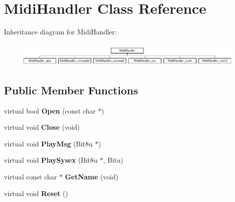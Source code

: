 \hypertarget{classMidiHandler}{\section{Midi\-Handler Class Reference}
\label{classMidiHandler}
}
Inheritance diagram for Midi\-Handler\-:\begin{figure}[H]
\begin{center}
\leavevmode
\includegraphics[height=1.220044cm]{classMidiHandler}
\end{center}
\end{figure}
\subsection*{Public Member Functions}
\begin{DoxyCompactItemize}
\item 
\hypertarget{classMidiHandler_aaac23e165375be912b77ab5d354ff8c1}{virtual bool {\bfseries Open} (const char $\ast$)}\label{classMidiHandler_aaac23e165375be912b77ab5d354ff8c1}

\item 
\hypertarget{classMidiHandler_a452affdc7cbccf4fbe60a574fb615575}{virtual void {\bfseries Close} (void)}\label{classMidiHandler_a452affdc7cbccf4fbe60a574fb615575}

\item 
\hypertarget{classMidiHandler_acd62ebefbe21ef89185897f571e39504}{virtual void {\bfseries Play\-Msg} (Bit8u $\ast$)}\label{classMidiHandler_acd62ebefbe21ef89185897f571e39504}

\item 
\hypertarget{classMidiHandler_aed229d871437ff05ff4e0b4ef12ff4a1}{virtual void {\bfseries Play\-Sysex} (Bit8u $\ast$, Bitu)}\label{classMidiHandler_aed229d871437ff05ff4e0b4ef12ff4a1}

\item 
\hypertarget{classMidiHandler_ac19f542b9af06067b69a2e518a86c443}{virtual const char $\ast$ {\bfseries Get\-Name} (void)}\label{classMidiHandler_ac19f542b9af06067b69a2e518a86c443}

\item 
\hypertarget{classMidiHandler_a1fe34188babb948021542d9b2693df29}{virtual void {\bfseries Reset} ()}\label{classMidiHandler_a1fe34188babb948021542d9b2693df29}

\end{DoxyCompactItemize}
